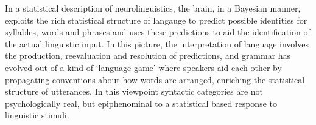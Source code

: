 \documentclass[10pt,letterpaper]{article}
\begin{document}

In a statistical description of neurolinguistics, the brain, in a
Bayesian manner, exploits the rich statistical structure of langauge
to predict possible identities for syllables, words and phrases and
uses these predictions to aid the identification of the actual
linguistic input. In this picture, the interpretation of language
involves the production, reevaluation and resolution of predictions,
and grammar has evolved out of a kind of \lq{}language game\rq{} where
speakers aid each other by propagating conventions about how words are
arranged, enriching the statistical structure of utterances. 
%
%
In this viewpoint syntactic categories are not psychologically real,
but epiphenominal to a statistical based response to linguistic
stimuli.


\end{document}
